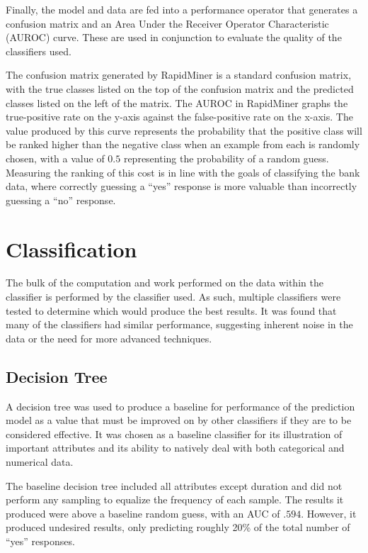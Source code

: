 \documentclass[prodmode]{acmsmall} %
\begin{document}
Finally, the model and data are fed into a performance operator that generates a
confusion matrix and an Area Under the Receiver Operator Characteristic
(AUROC) curve. These are used in conjunction to evaluate the quality of the
classifiers used.

The confusion matrix generated by RapidMiner is a standard confusion matrix,
with the true classes listed on the top of the confusion matrix and the
predicted classes listed on the left of the matrix. The AUROC in RapidMiner
graphs the true-positive rate on the y-axis against the false-positive rate on
the x-axis. The value produced by this curve represents the probability that the
positive class will be ranked higher than the negative class when an example
from each is randomly chosen, with a value of $0.5$ representing the probability
of a random guess. Measuring the ranking of this cost is in line with the goals
of classifying the bank data, where correctly guessing a ``yes'' response is
more valuable than incorrectly guessing a ``no'' response.

\section{Classification}
The bulk of the computation and work performed on the data within the classifier
is performed by the classifier used. As such, multiple classifiers were tested
to determine which would produce the best results. It was found that many of the
classifiers had similar performance, suggesting inherent noise in the data or
the need for more advanced techniques.

\subsection{Decision Tree}
A decision tree was used to produce a baseline for performance of the prediction
model as a value that must be improved on by other classifiers if they are to be
considered effective. It was chosen as a baseline classifier for its
illustration of important attributes and its ability to natively deal with both
categorical and numerical data.

The baseline decision tree included all attributes except duration and did not
perform any sampling to equalize the frequency of each sample. The results it
produced were above a baseline random guess, with an AUC of $.594$. However, it
produced undesired results, only predicting roughly 20\% of the total number of
``yes'' responses.
\end{document}
